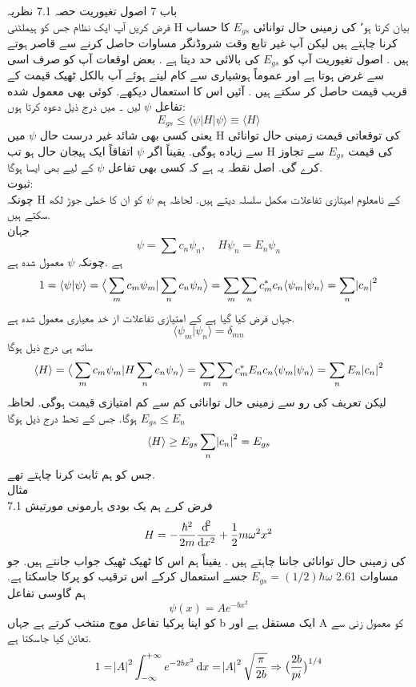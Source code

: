 \documentclass{book}
\begin{document}
باب 7 اصول تغيوریت حصہ 7.1 نظریہ\\
فرض کریں آپ ایک نظام جس کو ہیملٹنی H بیان کرتا ہو٬ کی زمینی حال توانائی
 \(E_{gs}\)
   کا حساب کرنا چاہتے ہیں لیکن آپ غير تابع وقت شروڈنگر مساوات حاصل کرنے سے قاصر ہوتے ہیں . اصول تغيوریت آپ کو 
  \(E_{gs}\)
   کی بالائی حد دیتا ہے . بعض اوقعات آپ کو صرف اسی سے غرض ہوتا ہے اور عموماً ہوشیاری سے کام لیتے ہوئے آپ بالکل ٹھیک قیمت کے قريب قیمت حاصل کر سکتے ہیں . آئیں اس کا استعمال دیکھے. کوئی بھی معمول شده تفاعل 
\(\psi\)
    لیں ۔ میں درج ذيل دعوه کرتا ہوں:
\[E_{gs}\le \langle \psi |H|\psi\rangle \equiv \langle H \rangle\]
یعنی کسی بھی شائد غير درست حال 
\(\psi\)
 میں H کی توقعاتی قیمت زمینی حال توانائی سے زياده ہوگی. یقیناً اگر 
 \(\psi\) 
 اتفاقاً ایک ہیجان حال ہو تب H کی قیمت
  \(E_{gs}\) 
 سے تجاوز کرے گی. اصل نقطہ یہ ہے کہ کسی بھی تفاعل 
 \(\psi\)
  کے لیے بھی ایسا ہوگا.\\
ثبوت: \\
چونکہ H کے نامعلوم امیتازی تفاعلات مكمل سلسلہ دیتے ہیں. لحاظہ ہم 
\(\psi\) 
کو ان کا خطی جوڑ لکھ سکتے ہیں.\\
جہان
\[\psi=\sum c_{n}\psi_{n}, \quad H\psi_{n}=E_{n}\psi_{n}\] 
ہے .چونکہ 
\(\psi\) 
معمول شده ہے\\
\[1=\langle \psi |\psi\rangle=\big\langle \sum_{m} c_{m}\psi_{m}|\sum_{n}c_{n}\psi_{n}\big\rangle=\sum_{m}\sum_{n}c_{m}^{*}c_{n}\langle \psi_{m}|\psi_{n}\rangle=\sum_{n}\abs{c_{n}}^{2}\]
جہاں فرض کیا گیا ہے کے امتیازی تفاعلات از خد معیاری معمول شدہ ہے.
\[\langle \psi_{m}|\psi_{n}\rangle=\delta_{mn}\]
ساتھ ہی درج ذیل ہوگا
\[\langle H \rangle=\big\langle \sum_{m} c_{m}\psi_{m}|H\sum_{n}c_{n}\psi_{n}\big\rangle=\sum_{m}\sum_{n}c_{m}^{*}E_{n}c_{n}\langle \psi_{m}|\psi_{n}\rangle=\sum_{n}E_{n}\abs{c_{n}}^{2}\]
ليكن تعريف کی رو سے زمینی حال توانائی کم سے کم  امتیازی قیمت ہوگی. لحاظہ
\(E_{gs}\le E_{n}\)
ہوگا. جس کے تحط درج ذیل ہوگا
\[\langle H \rangle \ge E_{gs}\sum_{n}\abs{c_{n}}^{2}=E_{gs}\]
جس کو ہم ثابت کرنا چاہتے تھے.\\
مثال \\7.1
فرض كرے ہم یک بودی ہارمونی مورتیش
\[H=-\frac{\hbar^{2}}{2m}\frac{\dif^{2}}{\dif{x^{2}}}+\frac{1}{2}m\omega^{2}x^{2}\]
کی زمینی حال توانائی جاننا چاہتے ہیں . یقیناً ہم اس کا ٹھیک ٹھیک جواب جانتے ہیں. جو مساوات 2.61
\(E_{gs}=(1/2)\hbar\omega\)
جسے استعمال کرکے اس ترقيب کو پرکا جاسکتا ہے. ہم گاوسی تفاعل
 \[\psi(x)=Ae^{-bx^{2}}\] 
کو اپنا پرکیا تفاعل موج منتخب کرتے ہے جہاں b ایک مستقل ہے اور A کو معمول زنی سے تعائن کیا جاسکتا ہے.
\[1=\abs{A}^{2}\int_{-\infty}^{+\infty}e^{-2bx^{2}}\dif{x}=\abs{A}^{2}\sqrt{\frac{\pi}{2b}}\Rightarrow \big (\frac{2b}{pi}\big )^{1/4}\]
\end{document}
